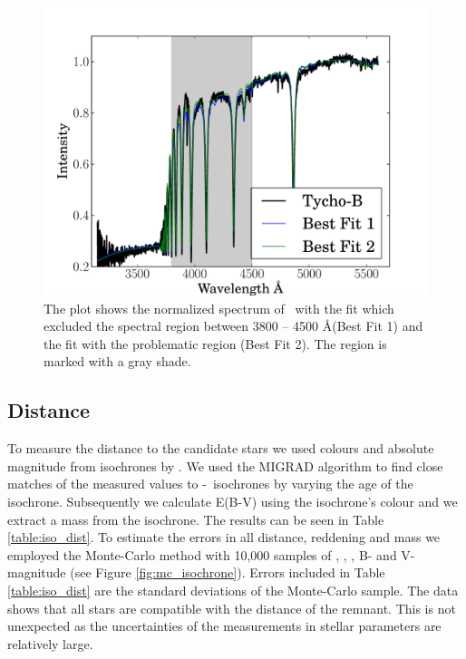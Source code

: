 \begin{figure}[h!]

\includegraphics[width=1.\textwidth]{chapter_sn1572_hires/plots/starb_spec_comp.pdf} 

\caption{The plot shows the normalized spectrum of \starb\ with the fit which excluded the spectral region between 3800 -- 4500 \AA (Best Fit 1) and the fit with the problematic region (Best Fit 2). The region is marked with a gray shade.  }
\label{fig:starb_spec_comp}
\end{figure}

\subsection{Distance}
\label{sec:distance}
To measure the distance to the candidate stars we used colours and absolute magnitude from isochrones by  \citet{2004ApJ...612..168P}. We used the MIGRAD algorithm  \citep{James:1975dr} to find close matches of the measured values to \teff-\logg\ isochrones by varying the age of the isochrone.  Subsequently we calculate E(B-V) using the isochrone's colour and we extract a mass from the isochrone. The results can be seen in Table \ref{table:iso_dist}. To estimate the errors in all distance, reddening and mass we employed the Monte-Carlo
method with 10,000 samples of \teff , \logg, \feh, B- and V-magnitude (see Figure  \ref{fig:mc_isochrone}).  Errors included in Table \ref{table:iso_dist} are the standard deviations of the Monte-Carlo sample. 
The data shows that all stars are compatible with the distance of the remnant. This is not unexpected as the uncertainties of the measurements in stellar parameters are relatively large.




